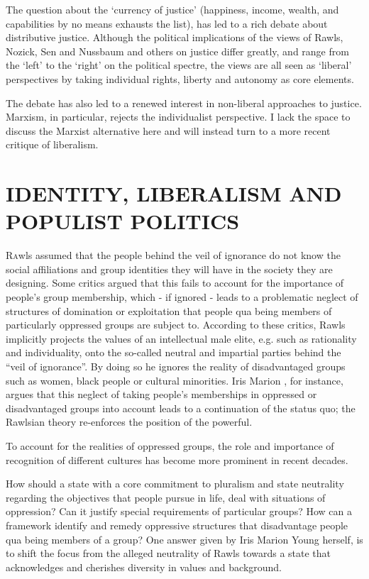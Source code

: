 \documentclass[11pt]{article}
\begin{document}
The question about the ‘currency of justice’ (happiness, income, wealth, and capabilities by no means exhausts the list), has led to a rich debate about distributive justice. Although the political implications of the views of Rawls,
Nozick, Sen and Nussbaum and others on justice differ greatly, and range from the ‘left’ to the ‘right’ on the political spectre, the views are all seen as ‘liberal’
perspectives by taking individual rights, liberty and autonomy as core elements.

The debate has also led to a renewed interest in non-liberal approaches to justice. Marxism, in particular, rejects the individualist perspective. I lack the space to discuss the Marxist alternative here and will instead turn to a more recent critique of liberalism.


\section{IDENTITY, LIBERALISM AND POPULIST POLITICS}
\lettrine[lines=3]{R}awls assumed that the people behind the veil of ignorance do not know the social affiliations and group identities they will have in the society they are designing. Some critics argued that this fails to account for the importance of people’s group membership, which - if ignored - leads to a problematic neglect of structures of domination or exploitation that people qua being members of particularly oppressed groups are subject to. According to these critics, Rawls implicitly projects the values of an intellectual male elite, e.g. such as rationality and individuality, onto the so-called neutral and impartial parties behind the “veil of ignorance”. By doing so he ignores the reality of disadvantaged groups such as women, black people or cultural minorities. Iris Marion \textcite{Young1990}, for instance, argues that this neglect of taking people’s memberships in oppressed or disadvantaged groups into account leads to a continuation of the status quo;
the Rawlsian theory re-enforces the position of the powerful.

To account for the realities of oppressed groups, the role and importance of recognition of different cultures has become more prominent in recent decades.

How should a state with a core commitment to pluralism and state neutrality regarding the objectives that people pursue in life, deal with situations of oppression? Can it justify special requirements of particular groups? How can a framework identify and remedy oppressive structures that disadvantage people qua being members of a group? One answer given by Iris Marion Young herself,
is to shift the focus from the alleged neutrality of Rawls towards a state that acknowledges and cherishes diversity in values and background.
\end{document}
